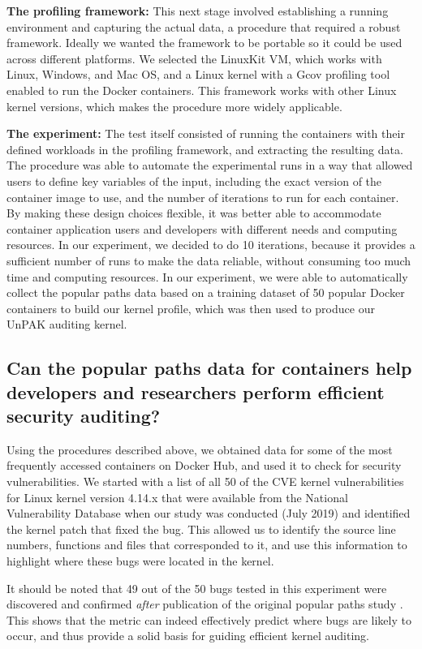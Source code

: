 \textbf{The profiling framework:} This next stage involved establishing a running environment and capturing the actual data, a procedure that required a robust framework. 
Ideally we wanted the framework to be portable so it could be used across different platforms. 
We selected the LinuxKit VM, which works with Linux, Windows, and Mac OS, and a Linux kernel with a Gcov profiling tool enabled to run the Docker containers. 
This framework works with  other Linux kernel versions, which makes the procedure more widely applicable. 

\textbf{The experiment:}  The test itself consisted of running the containers with their defined workloads in the profiling framework, and extracting the resulting  data. 
The procedure was able to automate the experimental runs in a way that allowed users to define key variables of the input, including the exact version of the container image to use, 
and the number of iterations to run for each container. By making  these design choices flexible, 
it was better able to accommodate container application users and developers with different needs and computing resources. In our experiment, 
we decided to do 10 iterations, because it provides a sufficient number of runs to make the data reliable, without consuming too much time and computing resources. 
In our experiment, we were able to automatically collect the popular paths data based on a training dataset of 50 popular Docker containers to build our kernel profile, 
which was then used to produce our UnPAK auditing kernel. 

\subsection{Can the popular paths data for containers help developers and researchers perform efficient security auditing?}
\label{sec.evaluation.2} 
Using the procedures described above, we obtained data for some of the most frequently accessed  containers on Docker Hub, and used it to check for security vulnerabilities. 
We started with a list of all 50 of the CVE kernel vulnerabilities for Linux kernel version 4.14.x that were available from the National Vulnerability Database when our study 
was conducted (July 2019) \cite{NVD} and identified the kernel patch that fixed the bug. 
This allowed us to identify the source line numbers, functions and files that corresponded to it, and use this information to highlight where these bugs were located in the kernel.   

It should be noted that 49 out of the 50 bugs tested in this experiment were discovered and confirmed \textit{after} publication of the original popular paths study \cite{Lock-in-Pop}. 
This shows that the metric can indeed effectively predict where bugs are likely to occur, and thus provide a solid basis for guiding efficient kernel auditing.  

